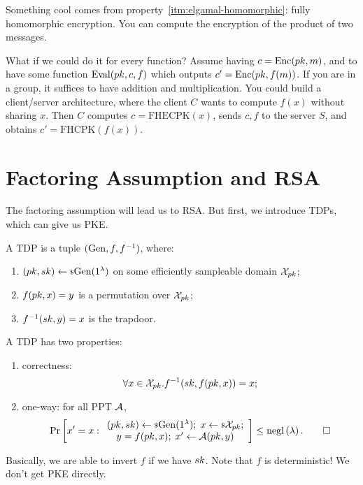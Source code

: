 Something cool comes from property~\ref{itm:elgamal-homomorphic}: fully homomorphic encryption.
You can compute the encryption of the product of two messages.

What if we could do it for every function?
Assume having $c = \mathrm{Enc}(pk, m)$, and to have some function $\mathrm{Eval}(pk, c, f)$ which outputs $c' = \mathrm{Enc}(pk, f(m))$.
If you are in a group, it suffices to have addition and multiplication.
You could build a client/server architecture, where the client $C$ wants to compute $f(x)$ without sharing $x$.
Then $C$ computes $c = \mathrm{FHECPK}(x)$, sends $c,f$ to the server $S$, and obtains $c' = \mathrm{FHCPK}(f(x))$.

\section{Factoring Assumption and \acs{RSA}}

The factoring assumption will lead us to \ac{RSA}.
But first, we introduce \acp{TDP}, which can give us \ac{PKE}.

\begin{definition}
	A \ac{TDP} is a tuple $(\mathrm{Gen}, f, f^{-1})$, where:
	\begin{enumerate}
		\item $(pk, sk) \leftarrow {\scriptstyle \$} {\mathrm{Gen}(1^{\lambda})}$ on some efficiently sampleable domain $\mathcal{X}_{pk}$;
		\item $f(pk, x) = y$ is a permutation over $\mathcal{X}_{pk}$;
		\item $f^{-1}(sk, y) = x$ is the trapdoor.
	\end{enumerate}
	A \ac{TDP} has two properties:
	\begin{enumerate}
		\item correctness:
			\begin{equation*}
				\forall x \in \mathcal{X}_{pk} . f^{-1}(sk, f(pk, x)) = x;
			\end{equation*}
		\item one-way: for all \ac{PPT} $\mathcal{A}$,
			\begin{equation*}
				\mathop{\mathrm{Pr}}\limits_{} \left[ {
					x' = x :
					\begin{array}{c}
					(pk, sk) \leftarrow {\scriptstyle \$} {\mathrm{Gen}(1^{\lambda})}; \;
					x \leftarrow {\scriptstyle \$} {\mathcal{X}_{pk}}; \\
					y = f(pk, x); \;
					x' \leftarrow \mathcal{A}(pk, y)
					\end{array}
				} \right]
				\le \mathrm{negl}\left({\lambda}\right).
				\qedhere
			\end{equation*}
	\end{enumerate}
\end{definition}
Basically, we are able to invert $f$ if we have $sk$.
Note that $f$ is deterministic!
We don't get \ac{PKE} directly.

